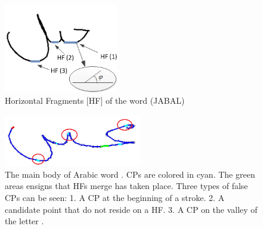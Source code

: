 \documentclass[journal,compsoc]{IEEEtran}
\begin{document}
\begin{figure}
\centering
\includegraphics[width=5cm]{./figures/horizontal_fragments}
\caption{Horizontal Fragments [HF] of the word (JABAL)}
\label{fig:horizontal_fragments}
\end{figure}

\begin{figure}
\centering
\includegraphics[width=6cm]{./figures/candidate_in_no_horizontal}
\caption{The main body of Arabic word . CPs are colored in cyan. The green areas ensigns that HFs merge has taken place. Three types of false CPs can be seen: 1. A CP at the beginning of a stroke. 2. A candidate point that do not reside on a HF. 3. A CP on the valley of the letter . }
\label{fig:candidate_in_no_horizontal}
\end{figure}
\end{document}
